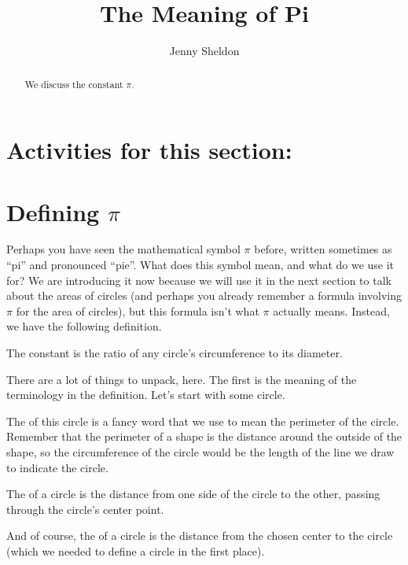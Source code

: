 \documentclass{ximera}
\title{The Meaning of Pi}
\author{Jenny Sheldon}
\begin{document}
\begin{abstract}
We discuss the constant $\pi$.
\end{abstract}
\maketitle

\section{Activities for this section:} 

\section{Defining $\pi$}

Perhaps you have seen the mathematical symbol $\pi$ before, written sometimes as ``pi'' and pronounced ``pie''. What does this symbol mean, and what do we use it for? We are introducing it now because we will use it in the next section to talk about the areas of circles (and perhaps you already remember a formula involving $\pi$ for the area of circles), but this formula isn't what $\pi$ actually means. Instead, we have the following definition.

\begin{definition}
The constant \dfn{$\pi$} is the ratio of any circle's circumference to its diameter.
\end{definition}

There are a lot of things to unpack, here. The first is the meaning of the terminology in the definition. Let's start with some circle.
\begin{image}
\end{image}
The  of this circle is a fancy word that we use to mean the perimeter of the circle. Remember that the perimeter of a shape is the distance around the outside of the shape, so the circumference of the circle would be the length of the line we draw to indicate the circle.

The  of a circle is the distance from one side of the circle to the other, passing through the circle's center point.

And of course, the  of a circle is the distance from the chosen center to the circle (which we needed to define a circle in the first place).
\begin{image}
\end{image}
\end{document}
